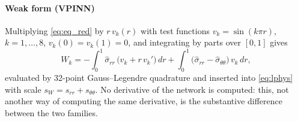 \documentclass[subscriptcorrection,upint,varvw,barcolor=Goldenrod3,mathalfa=cal=euler,balance,hyphenate,french,pdf-a]{asmejour} %
\begin{document}
\paragraph{Weak form (VPINN)}
Multiplying \eqref{eq:eq_red} by $r\,v_k(r)$ with test functions
$v_k=\sin(k\pi r)$, $k=1,\dots,8$, $v_k(0)=v_k(1)=0$, and integrating by parts over
$[0,1]$ gives \citep{kharazmi2021}
\begin{equation}
  W_k = -\int_0^1 \hat\sigma_{rr}\,\bigl(v_k + r\,v_k'\bigr)\,dr
        + \int_0^1 \bigl(\hat\sigma_{rr}-\hat\sigma_{\theta\theta}\bigr)\,v_k\,dr ,
  \label{eq:weak}
\end{equation}
evaluated by 32-point Gauss--Legendre quadrature and inserted into
\eqref{eq:lphys} with scale $s_W=s_{rr}+s_{\theta\theta}$.
No derivative of the network is computed: this, not another way of computing the
same derivative, is the substantive difference between the two families.
\end{document}
